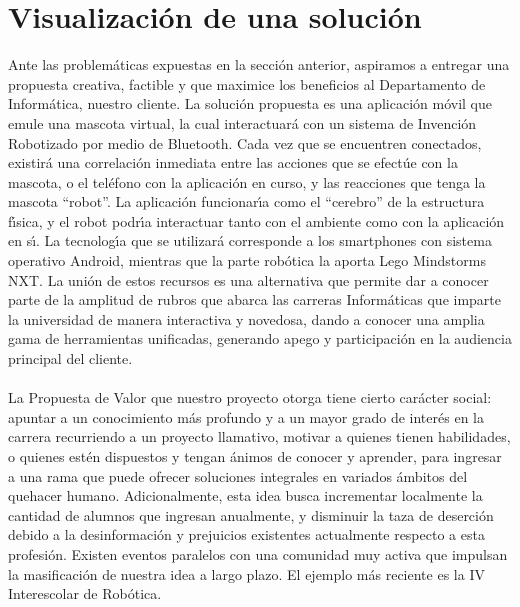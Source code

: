 \documentclass[letterpaper,12pt]{report} %
\numberwithin{equation}{section} %
\numberwithin{figure}{section} %
\numberwithin{table}{section} %
\begin{document}
\section{Visualizaci\'on de una soluci\'on}
Ante las problem\'aticas expuestas en la secci\'on anterior, aspiramos a entregar una propuesta creativa, factible y que maximice los beneficios al Departamento de Inform\'atica, nuestro cliente. La soluci\'on propuesta es una aplicaci\'on m\'ovil que emule una mascota virtual, la cual interactuar\'a con un sistema de Invenci\'on Robotizado por medio de Bluetooth. Cada vez que se encuentren conectados, existir\'a una correlaci\'on inmediata entre las acciones que se efect\'ue con la mascota, o el tel\'efono con la aplicaci\'on en curso, y las reacciones que tenga la mascota ``robot''. La aplicaci\'on funcionar\'{\i}a como el ``cerebro'' de la estructura f\'{\i}sica, y el robot podr\'{\i}a interactuar tanto con el ambiente como con la aplicaci\'on en s\'{\i}. La tecnolog\'{\i}a que se utilizar\'a corresponde a los smartphones con sistema operativo Android, mientras que la parte rob\'otica la aporta Lego Mindstorms NXT. La uni\'on de estos recursos es una alternativa que permite dar a conocer parte de la amplitud de rubros que abarca las carreras Inform\'aticas que imparte la universidad de manera interactiva y novedosa, dando a conocer una amplia gama de herramientas unificadas, generando apego y participaci\'on en la audiencia principal del cliente.\\~\\
La Propuesta de Valor que nuestro proyecto otorga tiene cierto car\'acter social: apuntar a un conocimiento m\'as profundo y a un mayor grado de  inter\'es en la carrera recurriendo a un proyecto llamativo, motivar a quienes tienen habilidades, o quienes est\'en dispuestos y tengan \'animos de conocer y aprender, para ingresar a una rama que puede ofrecer soluciones integrales en variados \'ambitos del quehacer humano. Adicionalmente, esta idea busca incrementar localmente la cantidad de alumnos que ingresan anualmente, y disminuir la taza de deserci\'on debido a la desinformaci\'on y prejuicios existentes actualmente respecto a esta profesi\'on. Existen eventos paralelos con una comunidad muy activa que impulsan la masificaci\'on de nuestra idea a largo plazo. El ejemplo m\'as reciente es la IV Interescolar de Rob\'otica.\\~\\
\end{document}
